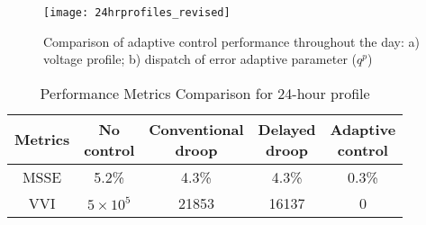 \documentclass[journal]{IEEEtran}
\newcommand{\squeezeup}{\vspace{-2.5mm}}
\begin{document}
\begin{figure}
	\centering
	\texttt{[image: 24hrprofiles\_revised]}
    \vspace{-1.5em}
    \caption {Comparison of adaptive control performance throughout the day: a) voltage profile; b) dispatch of error adaptive parameter ($q^p$)}
    \label{fig:24hr_voltage}
    \vspace{-1.5mm}
\end{figure}

\begin{table}
\caption{Performance Metrics Comparison for 24-hour profile}
\vspace{-1em}
\label{tab:24_hours}
\begin{center}
\renewcommand{\arraystretch}{1}
\begin{tabular}{|c|c|c|c|c|}
\hline
Metrics & \shortstack{No\\control} & \shortstack {Conventional \\droop} & \shortstack{Delayed  \\droop} & \shortstack{Adaptive \\control}\\
\hline
MSSE & 5.2\% & 4.3\% & 4.3\% & 0.3\%\\
VVI & $5\times 10^5$ & 21853 & 16137 & 0\\
\hline
\end{tabular}
\end{center}
\squeezeup
\end{table}
\end{document}
